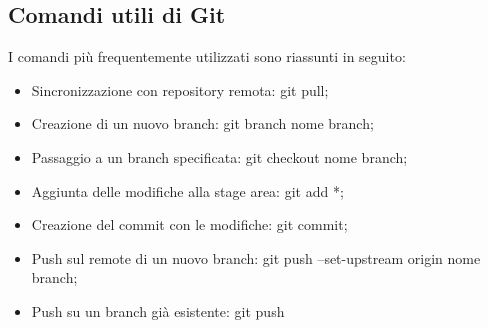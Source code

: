 \documentclass[12pt]{article}
\begin{document}
\subsection{Comandi utili di Git}
I comandi più frequentemente utilizzati sono riassunti in seguito:
\begin{itemize}
    \item Sincronizzazione con repository remota: git pull;
    \item Creazione di un nuovo branch: git branch nome branch;
    \item Passaggio a un branch specificata: git checkout nome branch;
    \item Aggiunta delle modifiche alla stage area: git add *;
    \item Creazione del commit con le modifiche: git commit;
    \item Push sul remote di un nuovo branch: git push --set-upstream origin nome branch;
    \item Push su un branch già esistente: git push
\end{itemize}
\end{document}
